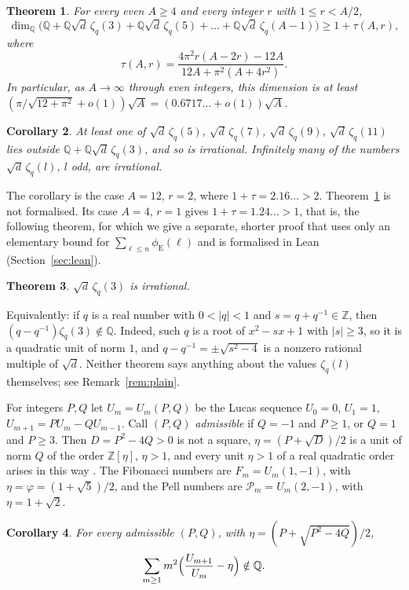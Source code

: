 \documentclass[11pt]{amsart}
\newtheorem{theorem}{Theorem}[section]
\newtheorem{corollary}[theorem]{Corollary}
\theoremstyle{definition}
\theoremstyle{remark}
\numberwithin{equation}{section}
\newcommand{\ZZ}{\mathbb{Z}}
\newcommand{\QQ}{\mathbb{Q}}
\newcommand{\eu}{\phi_{\mathrm E}}
\begin{document}
\begin{theorem}\label{thm:many}
For every even $A\ge4$ and every integer $r$ with $1\le r<A/2$,
\[
\dim_\QQ\bigl(\QQ+\QQ\sqrt d\,\zeta_q(3)+\QQ\sqrt d\,\zeta_q(5)+\dots+\QQ\sqrt d\,\zeta_q(A-1)\bigr)\ge1+\tau(A,r),
\]
where
\[
\tau(A,r)=\frac{4\pi^2r(A-2r)-12A}{12A+\pi^2(A+4r^2)}.
\]
In particular, as $A\to\infty$ through even integers, this dimension is at least $(\pi/\sqrt{12+\pi^2}+o(1))\sqrt A
=(0.6717\ldots+o(1))\sqrt A$.
\end{theorem}

\begin{corollary}\label{cor:many}
At least one of $\sqrt d\,\zeta_q(5)$, $\sqrt d\,\zeta_q(7)$, $\sqrt d\,\zeta_q(9)$, $\sqrt d\,\zeta_q(11)$ lies
outside $\QQ+\QQ\sqrt d\,\zeta_q(3)$, and so is irrational. Infinitely many of the numbers $\sqrt d\,\zeta_q(l)$, $l$ odd,
are irrational.
\end{corollary}

The corollary is the case $A=12$, $r=2$, where $1+\tau=2.16\ldots>2$. Theorem~\ref{thm:many} is not formalised. Its case
$A=4$, $r=1$ gives $1+\tau=1.24\ldots>1$, that is, the following theorem, for which we give a separate, shorter proof that
uses only an elementary bound for $\sum_{\ell\le n}\eu(\ell)$ and is formalised in Lean (Section~\ref{sec:lean}).

\begin{theorem}\label{thm:main}
$\sqrt d\,\zeta_q(3)$ is irrational.
\end{theorem}

Equivalently: if $q$ is a real number with $0<|q|<1$ and $s=q+q^{-1}\in\ZZ$, then $(q-q^{-1})\zeta_q(3)\notin\QQ$.
Indeed, such $q$ is a root of $x^2-sx+1$ with $|s|\ge3$, so it is a quadratic unit of norm $1$, and $q-q^{-1}=
\pm\sqrt{s^2-4}$ is a nonzero rational multiple of $\sqrt d$. Neither theorem says anything about the values
$\zeta_q(l)$ themselves; see Remark~\ref{rem:plain}.

For integers $P,Q$ let $U_m=U_m(P,Q)$ be the Lucas sequence $U_0=0$, $U_1=1$, $U_{m+1}=PU_m-QU_{m-1}$. Call $(P,Q)$
\emph{admissible} if $Q=-1$ and $P\ge1$, or $Q=1$ and $P\ge3$. Then $D=P^2-4Q>0$ is not a square, $\eta=(P+\sqrt D)/2$
is a unit of norm $Q$ of the order $\ZZ[\eta]$, $\eta>1$, and every unit $\eta>1$ of a real quadratic order arises in
this way \cite[\S1]{Kri26b}. The Fibonacci numbers are $F_m=U_m(1,-1)$, with $\eta=\varphi=(1+\sqrt5)/2$, and the Pell
numbers are $\mathcal P_m=U_m(2,-1)$, with $\eta=1+\sqrt2$.

\begin{corollary}\label{cor:lucas}
For every admissible $(P,Q)$, with $\eta=(P+\sqrt{P^2-4Q})/2$,
\[
\sum_{m\ge1}m^2\Bigl(\frac{U_{m+1}}{U_m}-\eta\Bigr)\notin\QQ.
\]
\end{corollary}
\end{document}
